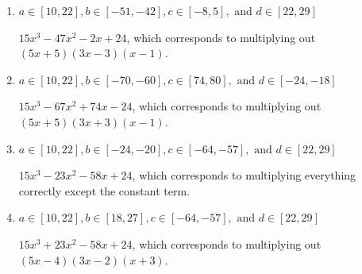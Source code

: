 \documentclass{extbook}[14pt]
\begin{document}
\begin{enumerate}
{\begin{enumerate}[label=\Alph*.]
* $15x^{3} -23 x^{2} -58 x -24$, which is the correct option.
\item \( a \in [10, 22], b \in [-51, -42], c \in [-8, 5], \text{ and } d \in [22, 29] \)

$15x^{3} -47 x^{2} -2 x + 24$, which corresponds to multiplying out $(5x + 5)(3x -3)(x -1)$.
\item \( a \in [10, 22], b \in [-70, -60], c \in [74, 80], \text{ and } d \in [-24, -18] \)

$15x^{3} -67 x^{2} +74 x -24$, which corresponds to multiplying out $(5x + 5)(3x + 3)(x -1)$.
\item \( a \in [10, 22], b \in [-24, -20], c \in [-64, -57], \text{ and } d \in [22, 29] \)

$15x^{3} -23 x^{2} -58 x + 24$, which corresponds to multiplying everything correctly except the constant term.
\item \( a \in [10, 22], b \in [18, 27], c \in [-64, -57], \text{ and } d \in [22, 29] \)

$15x^{3} +23 x^{2} -58 x + 24$, which corresponds to multiplying out $(5x -4)(3x -2)(x + 3)$.
\end{enumerate}

}
\end{enumerate}
\end{document}
